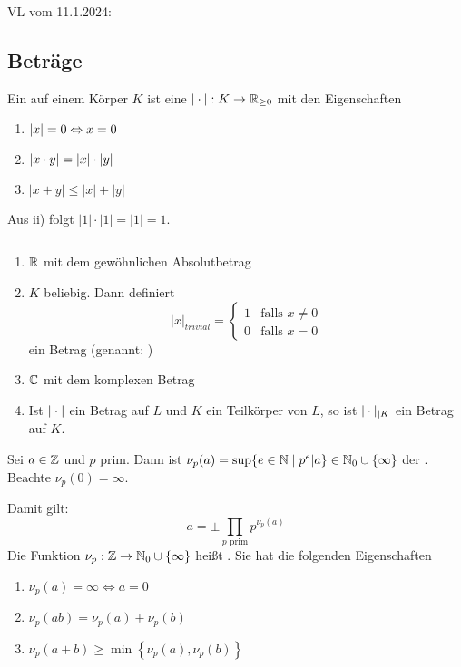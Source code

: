 \documentclass[../main.tex]{subfiles}
\begin{document}
\begin{flushright}
VL vom 11.1.2024:
\end{flushright}
\subsection{Beträge}
\begin{definition} %
    Ein  auf einem Körper $K$ ist eine $|\cdot|: K\rightarrow \mathbb{R}_{\geq0}$ mit den Eigenschaften
    \begin{enumerate}[label=\roman*)]
        \item $\left\vert x \right\vert = 0 \Leftrightarrow x =0$
        \item $\left\vert x\cdot y \right\vert = |x| \cdot |y|$
        \item $|x+y| \leq |x| + |y|$
    \end{enumerate}
    Aus ii) folgt $|1|\cdot |1| =|1| = 1$.
\end{definition}
\begin{example}$ $
    \begin{enumerate}[label=\roman*)] %
        \item $\mathbb{R}$ mit dem gewöhnlichen Absolutbetrag
        \item $K$ beliebig. Dann definiert 
        $$|x|_{trivial} = \begin{cases}
            1 & \text{falls }x\neq 0\\
            0 & \text{falls }x= 0
        \end{cases}$$
        ein Betrag (genannt: )
        \item $\mathbb{C}$ mit dem komplexen Betrag
        \item Ist $|\cdot|$ ein Betrag auf $L$ und $K$ ein Teilkörper von $L$, so ist $|\cdot|_{|K}$ ein Betrag auf $K$.
    \end{enumerate}
\end{example}
\begin{definition} 
    Sei $a\in \mathbb{Z}$ und $p$ prim. Dann ist
    $\nu_p(a)= \sup\{e\in \mathbb{N}\mid p^e|a\}\in \mathbb{N}_0\cup \{\infty\}$
    der .
Beachte $\nu_p(0) = \infty$.
\end{definition}
Damit gilt:
$$a = \pm \prod_{p\text{ prim}} p^{\nu_p(a)}$$
Die Funktion $\nu_p:\mathbb{Z}\rightarrow \mathbb{N}_0\cup \{\infty\}$ heißt . Sie hat die folgenden Eigenschaften
\begin{enumerate}[label=\roman*)]%
    \item $\nu_p(a) = \infty \Leftrightarrow a = 0$
    \item $\nu_p(ab) = \nu_p(a)+\nu_p(b)$
    \item $\nu_p(a+b) \geq \min\left\{\nu_p(a),\nu_p(b)\right\}$
\end{enumerate}
\end{document}
